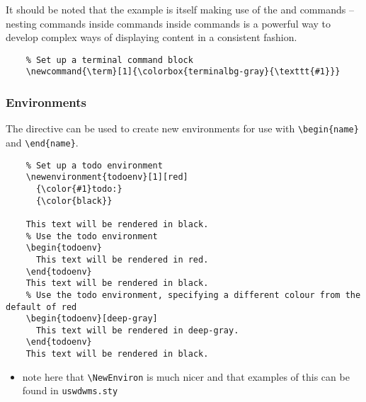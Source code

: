 It should be noted that the example is itself making use of the  and  commands -- nesting commands inside commands inside commands is a powerful way to develop complex ways of displaying content in a consistent fashion.

\begin{listing}[H]
  \captionsetup{skip=\skiplistingcaptionlen}
  \begin{verbatim}
    % Set up a terminal command block
    \newcommand{\term}[1]{\colorbox{terminalbg-gray}{\texttt{#1}}}
  \end{verbatim}
  \caption{\texttt{\textbackslash newcommand} command example}
  \label{example:lst:basic_syntax:newcommand}
\end{listing}

\subsubsection{Environments}
The  directive can be used to create new environments for use with \texttt{\textbackslash begin\{name\}} and \texttt{\textbackslash end\{name\}}.

\begin{listing}[H]
  \captionsetup{skip=\skiplistingcaptionlen}
  \begin{verbatim}
    % Set up a todo environment
    \newenvironment{todoenv}[1][red]
      {\color{#1}todo:}
      {\color{black}}

    This text will be rendered in black.
    % Use the todo environment
    \begin{todoenv}
      This text will be rendered in red.
    \end{todoenv}
    This text will be rendered in black.
    % Use the todo environment, specifying a different colour from the default of red
    \begin{todoenv}[deep-gray]
      This text will be rendered in deep-gray.
    \end{todoenv}
    This text will be rendered in black.
  \end{verbatim}
  \caption{\texttt{\textbackslash newenvironment} command example}
  \label{example:lst:basic_syntax:newenvironment}
\end{listing}

\noindent\begin{todoenv}
  \begin{itemize}
    \item note here that \texttt{\textbackslash NewEnviron} is much nicer and that examples of this can be found in \texttt{uswdwms.sty}
  \end{itemize}
\end{todoenv}

